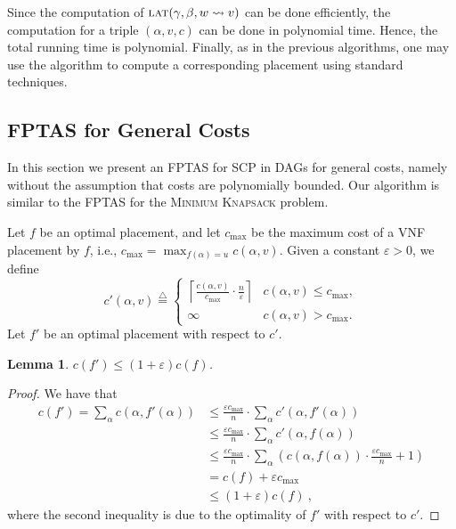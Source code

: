 \documentclass[11pt]{article}
\newtheorem{lemma}{Lemma}
\newcommand{\eqdf}{\stackrel{\scriptscriptstyle \triangle}{=}}
\newcommand{\paren}[1]{\left( #1 \right)}
\newcommand{\ceil}[1]{\left\lceil {#1} \right\rceil}
\newcommand{\eps}{\varepsilon}
\newcommand{\scp}{\textsc{SCP}\xspace}
\newcommand{\latency}{\textsc{lat}\xspace}
\begin{document}
Since the computation of $\latency(\gamma,\beta,w \leadsto v)$ can be
done efficiently, the computation for a triple $(\alpha,v,c)$ can be
done in polynomial time.  Hence, the total running time is polynomial.
Finally, as in the previous algorithms, one may use the algorithm to
compute a corresponding placement
using standard techniques.


\subsection{FPTAS for General Costs}
\label{sub:fptas}

In this section we present an FPTAS for \scp in DAGs for general
costs, namely without the assumption that costs are polynomially
bounded.  Our algorithm is similar to the FPTAS for the
\textsc{Minimum Knapsack} problem.

Let $f$ be an optimal placement, and let $c_{\max}$ be the maximum
cost of a VNF placement by $f$, i.e., $c_{\max} = \max_{f(\alpha) =
  u} c(\alpha,v)$.
%
Given a constant $\eps>0$, we define
\[
c'(\alpha, v) \eqdf
\begin{cases}
\ceil{\frac{c(\alpha, v)}{c_{\max}} \cdot \frac{n}{\eps}}
       & c(\alpha, v) \leq c_{\max}, \\
\infty & c(\alpha, v) > c_{\max}.
\end{cases}
\]
Let $f'$ be an optimal placement with respect to $c'$.

\begin{lemma}
\label{lemma:guess}
$c(f') \leq (1+\eps)c(f)$.
\end{lemma}
\begin{proof}
We have that
\begin{align*}
c(f')
=    \sum_{\alpha} c(\alpha,f'(\alpha)) %
& \leq \frac{\eps c_{\max}}{n} \cdot \sum_{\alpha} c'(\alpha,f'(\alpha)) \\
& \leq \frac{\eps c_{\max}}{n} \cdot \sum_{\alpha} c'(\alpha,f(\alpha)) \\
& \leq \frac{\eps c_{\max}}{n} \cdot
     \sum_{\alpha}
       \paren{ c(\alpha,f(\alpha)) \cdot \frac{\eps c_{\max}}{n} + 1} \\
& =    c(f) + \eps c_{\max} \\
& \leq (1+\eps) c(f)
~,
\end{align*}
where the second inequality is due to the optimality of $f'$ with
respect to $c'$.
\end{proof}
\end{document}
